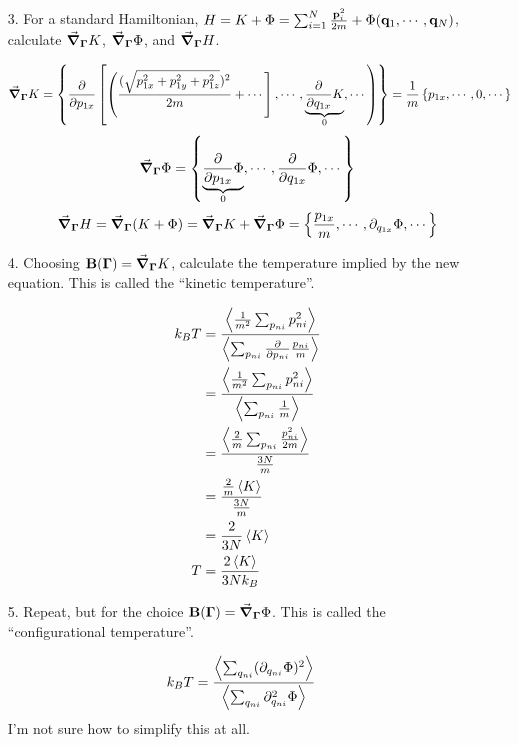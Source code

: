 \documentclass[a4paper,twoside]{article}
\begin{document}
\begin{itemize}
\begin{problem}
        \end{problem}
    \item[3.] For a standard Hamiltonian, $ H = K + \Phi = \sum_{i=1}^{N} \frac{\vb{p}_i^2}{2m} + \Phi(\vb{q}_1, \cdots, \vb{q}_N) $, calculate $ \grad_{\vb{\Gamma}} K $, $ \grad_{\vb{\Gamma}} \Phi $, and $ \grad_{\vb{\Gamma}} H $.
        \begin{problem}
            \begin{equation}
                \grad_{\vb{\Gamma}} K = \left\{\pdv{p_{1x}}\left[\left( \frac{(\sqrt{p_{1x}^2 + p_{1y}^2 + p_{1z}^2})^2}{2m} + \cdots\right] , \cdots, \underbrace{\pdv{q_{1x}} K}_{0}, \cdots \right)\right\} = \frac{1}{m} \left\{ p_{1x}, \cdots, 0, \cdots \right\}
            \end{equation}
            \begin{equation}
                \grad_{\vb{\Gamma}} \Phi = \left\{ \underbrace{\pdv{p_{1x}} \Phi}_{0}, \cdots, \pdv{q_{1x}} \Phi, \cdots \right\}
            \end{equation}
            \begin{equation}
                \grad_{\vb{\Gamma}} H = \grad_{\vb{\Gamma}} (K + \Phi) = \grad_{\vb{\Gamma}} K + \grad_{\vb{\Gamma}} \Phi = \left\{ \frac{p_{1x}}{m}, \cdots, \partial_{q_{1x}} \Phi, \cdots \right\}
            \end{equation}
        \end{problem}
    \item[4.] Choosing $ \vb{B}(\vb{\Gamma}) = \grad_{\vb{\Gamma}} K $, calculate the temperature implied by the new equation. This is called the ``kinetic temperature''.
        \begin{problem}
            \begin{align}
                k_B T &= \frac{\ev{\frac{1}{m^2} \sum_{p_{ni}} p_{ni}^2}}{\ev{\sum_{p_{ni}} \pdv{p_{ni}} \frac{p_{ni}}{m}}}\\
                &= \frac{\ev{\frac{1}{m^2} \sum_{p_{ni}} p_{ni}^2}}{\ev{\sum_{p_{ni}} \frac{1}{m}}}\\
                &= \frac{\ev{\frac{2}{m} \sum_{p_{ni}} \frac{p_{ni}^2}{2m}}}{\frac{3N}{m}}\\
                &= \frac{\frac{2}{m} \ev{K}}{\frac{3N}{m}}\\
                &= \frac{2}{3N} \ev{K} \\
                T &= \frac{2\ev{K}}{3N k_B} 
            \end{align}
        \end{problem}
    \item[5.] Repeat, but for the choice $ \vb{B}(\vb{\Gamma}) = \grad_{\vb{\Gamma}} \Phi $. This is called the ``configurational temperature''.
        \begin{problem}
            \begin{align}
                k_B T &= \frac{\ev{\sum_{q_{ni}} (\partial_{q_{ni}} \Phi)^2}}{\ev{\sum_{q_{ni}} \partial_{q_{ni}}^2 \Phi}}
            \end{align}
            I'm not sure how to simplify this at all.
        \end{problem}
\end{itemize}
\end{document}
